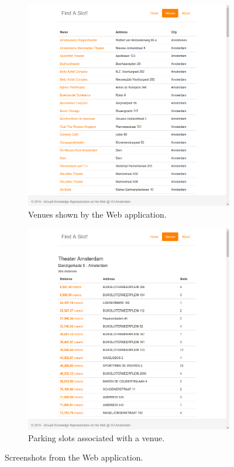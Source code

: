 \documentclass[runningheads,a4paper]{../../StyleFiles/llncs}
\begin{document}
\begin{figure}
	\centering
	\begin{subfigure}[b]{.4\textwidth}
		\includegraphics[width=\textwidth]{img/app-venues.png}
		\caption{Venues shown by the Web application.}
		\label{fig:app-venues}
	\end{subfigure}
	\qquad
	\begin{subfigure}[b]{.4\textwidth}
		\includegraphics[width=\textwidth]{img/app-slots.png}
		\caption{Parking slots associated with a venue.}
		\label{fig:app-slots}
	\end{subfigure}
	\caption{Screenshots from the Web application.}
	\label{fig:app}
\end{figure}
\end{document}
